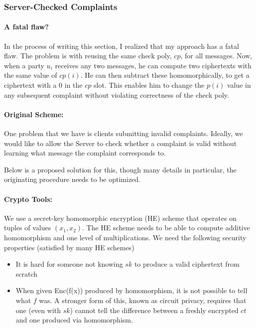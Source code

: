 \newcommand{\tuple}[2]{\langle #1, #2 \rangle }
\newcommand{\tup}[1]{\langle #1, #1 \rangle}
\subsubsection{Server-Checked Complaints}
\paragraph{A fatal flaw?}
In the process of writing this section, I realized that my approach has a fatal flaw.  The problem is with reusing the same check poly, $cp$, for all messages.  Now, when a party $u_i$ receives any two messages, he can compute two ciphertexts with the same value of $cp(i)$.  He can then subtract these homomorphically, to get a ciphertext with a 0 in the $cp$ slot.  This enables him to change the $p(i)$ value in any subsequent complaint without violating correctness of the check poly.  

\paragraph{Original Scheme:}
One problem that we have is clients submitting invalid complaints.  Ideally, we would like to allow the Server to check whether a complaint is valid without learning what message the complaint corresponds to.

Below is a proposed solution for this, though many details in particular, the originating procedure needs to be optimized.

\paragraph{Crypto Tools:}
We use a secret-key homomorphic encryption (HE) scheme that operates on tuples of values $(x_1,x_2)$.  The HE scheme needs to be able to compute additive homomorphism and one level of multiplications.
We need the following security properties (satisfied by many HE schemes)
\begin{itemize}
\item It is hard for someone not knowing $sk$ to produce a valid ciphertext from scratch
\item When given Enc(f(x)) produced by homomorphism, it is not possible to tell what $f$ was.  A stronger form of this, known as circuit privacy, requires that one (even with $sk$) cannot tell the difference between a freshly encrypted $ct$ and one produced via homomorphism.
\end{itemize}
